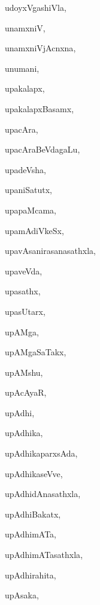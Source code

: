 \begin{multicols}{3}
{\noindent
{udoyxVgashiVla}, \pageref{udoyxVgashiVla}

\noindent
{unamxniV}, \pageref{unamxniV}

\noindent
{unamxniVjAcnxna}, \pageref{unamxniVjAcnxna}

\noindent
{unumani}, \pageref{unumani}

\noindent
{upakalapx}, \pageref{upakalapx}

\noindent
{upakalapxBasamx}, \pageref{upakalapxBasamx}

\noindent
{upacAra}, \pageref{upacAra}

\noindent
{upacAraBeVdagaLu}, \pageref{upacAraBeVdagaLu}

\noindent
{upadeVsha}, \pageref{upadeVsha}

\noindent
{upaniSatutx}, \pageref{upaniSatutx}

\noindent
{upapaMcama}, \pageref{upapaMcama}

\noindent
{upamAdiVkeSx}, \pageref{upamAdiVkeSx}

\noindent
{upavAsanirasanasathxla}, \pageref{upavAsanirasanasathxla}

\noindent
{upaveVda}, \pageref{upaveVda}

\noindent
{upasathx}, \pageref{upasathx}

\noindent
{upasUtarx}, \pageref{upasUtarx}

\noindent
{upAMga}, \pageref{upAMga}

\noindent
{upAMgaSaTakx}, \pageref{upAMgaSaTakx}

\noindent
{upAMshu}, \pageref{upAMshu}

\noindent
{upAcAyaR}, \pageref{upAcAyaR}

\noindent
{upAdhi}, \pageref{upAdhi}

\noindent
{upAdhika}, \pageref{upAdhika}

\noindent
{upAdhikaparxsAda}, \pageref{upAdhikaparxsAda}

\noindent
{upAdhikaseVve}, \pageref{upAdhikaseVve}

\noindent
{upAdhidAnasathxla}, \pageref{upAdhidAnasathxla}

\noindent
{upAdhiBakatx}, \pageref{upAdhiBakatx}

\noindent
{upAdhimATa}, \pageref{upAdhimATa}

\noindent
{upAdhimATasathxla}, \pageref{upAdhimATasathxla}

\noindent
{upAdhirahita}, \pageref{upAdhirahita}

\noindent
{upAsaka}, \pageref{upAsaka}

}
\end{multicols}
